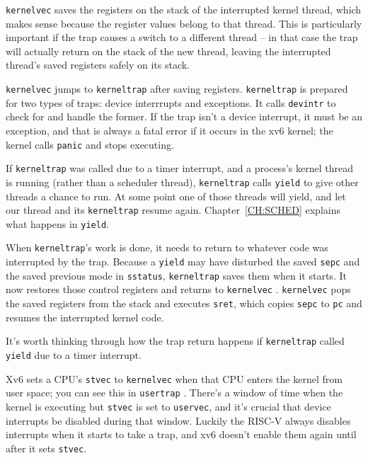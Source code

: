{\tt kernelvec} saves the registers on the stack of the interrupted
kernel thread, which makes sense because the register values belong to
that thread. This is particularly important if the trap causes a
switch to a different thread -- in that case the trap will actually
return on the stack of the new thread, leaving the interrupted
thread's saved registers safely on its stack.

{\tt kernelvec} jumps to {\tt kerneltrap}
 after saving registers.
{\tt kerneltrap} is prepared for two types of traps:
device interrrupts and exceptions. It calls
{\tt devintr}
to check for and handle the former.
If the trap isn't a device interrupt, it must be an exception,
and that is always a fatal error if it occurs in the xv6 kernel;
the kernel calls \lstinline{panic} and stops executing.

If {\tt kerneltrap} was called due to a timer interrupt, and a
process's kernel thread is running (rather than a scheduler thread),
{\tt kerneltrap} calls {\tt yield} to give other threads a chance to
run. At some point one of those threads will yield, and let our thread
and its {\tt kerneltrap} resume again.
Chapter~\ref{CH:SCHED} explains what happens in {\tt yield}.

When {\tt kerneltrap}'s work is done, it needs to return to whatever
code was interrupted by the trap. Because a {\tt yield} may have
disturbed the saved {\tt sepc} and the saved previous mode in {\tt sstatus},
{\tt kerneltrap} saves them when it starts. It now restores those
control registers and returns to {\tt kernelvec}
.
{\tt kernelvec} pops the saved registers from the stack and
executes {\tt sret}, which copies {\tt sepc} to {\tt pc}
and resumes the interrupted kernel code.

It's worth thinking through how the trap return happens if
{\tt kerneltrap} called {\tt yield} due to a timer interrupt.

Xv6 sets a CPU's {\tt stvec} to {\tt kernelvec} when that CPU
enters the kernel from user space; you can see this in {\tt usertrap}
.
There's a window of time when the kernel is executing
but {\tt stvec} is set to {\tt uservec}, and it's crucial that device
interrupts be disabled during that window.
Luckily the RISC-V always disables interrupts when it starts
to take a trap, and xv6 doesn't enable them again until
after it sets {\tt stvec}.


